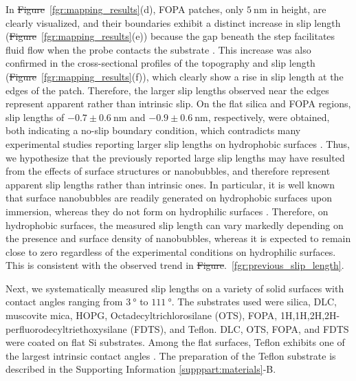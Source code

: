 \documentclass[journal=jacsat,manuscript=article]{achemso}
\providecommand{\DIFadd}[1]{{\protect\color{blue}\uwave{#1}}} %
\providecommand{\DIFdel}[1]{{\protect\color{red}\sout{#1}}} %
\providecommand{\DIFaddbegin}{} %
\providecommand{\DIFaddend}{} %
\providecommand{\DIFdelbegin}{} %
\providecommand{\DIFdelend}{} %
\newcommand{\DIFscaledelfig}{0.5}
\newlength{\DIFdelgraphicswidth} %
\newlength{\DIFdelgraphicsheight} %
\newcommand{\DIFaddincludegraphics}[2][]{{\color{blue}\fbox{\DIFOincludegraphics[#1]{#2}}}} %
\newcommand{\DIFdelincludegraphics}[2][]{%
\sbox{\DIFdelgraphicsbox}{\DIFOincludegraphics[#1]{#2}}%
\settoboxwidth{\DIFdelgraphicswidth}{\DIFdelgraphicsbox} %
\settoboxtotalheight{\DIFdelgraphicsheight}{\DIFdelgraphicsbox} %
\scalebox{\DIFscaledelfig}{%
\parbox[b]{\DIFdelgraphicswidth}{\usebox{\DIFdelgraphicsbox}\\[-\baselineskip] \rule{\DIFdelgraphicswidth}{0em}}\llap{\resizebox{\DIFdelgraphicswidth}{\DIFdelgraphicsheight}{%
\setlength{\unitlength}{\DIFdelgraphicswidth}%
\begin{picture}(1,1)%
\thicklines\linethickness{2pt} %
{\color[rgb]{1,0,0}\put(0,0){\framebox(1,1){}}}%
{\color[rgb]{1,0,0}\put(0,0){\line( 1,1){1}}}%
{\color[rgb]{1,0,0}\put(0,1){\line(1,-1){1}}}%
\end{picture}%
}\hspace*{3pt}}} %
} %
\DeclareRobustCommand{\DIFaddbegin}{\DIFOaddbegin \let\includegraphics\DIFaddincludegraphics} %
\DeclareRobustCommand{\DIFaddend}{\DIFOaddend \let\includegraphics\DIFOincludegraphics} %
\DeclareRobustCommand{\DIFdelbegin}{\DIFOdelbegin \let\includegraphics\DIFdelincludegraphics} %
\DeclareRobustCommand{\DIFdelend}{\DIFOaddend \let\includegraphics\DIFOincludegraphics} %
\begin{document}
In \DIFdelbegin \DIFdel{Figure}\DIFdelend \DIFaddbegin \DIFadd{Fig.}\DIFaddend ~\ref{fgr:mapping_results}(d), FOPA patches, only \(\SI{5}{\nano\metre}\) in height, are clearly visualized, and their boundaries exhibit a distinct increase in slip length (\DIFdelbegin \DIFdel{Figure}\DIFdelend \DIFaddbegin \DIFadd{Fig.}\DIFaddend ~\ref{fgr:mapping_results}(e)) because the gap beneath the step facilitates fluid flow when the probe contacts the substrate \cite{Ybert2007-jv}. This increase was also confirmed in the cross-sectional profiles of the topography and slip length (\DIFdelbegin \DIFdel{Figure}\DIFdelend \DIFaddbegin \DIFadd{Fig.}\DIFaddend ~\ref{fgr:mapping_results}(f)), which clearly show a rise in slip length at the edges of the patch. Therefore, the larger slip lengths observed near the edges represent apparent rather than intrinsic slip. On the flat silica and FOPA regions, slip lengths of \(-0.7 \pm \SI{0.6}{\nano\metre}\) and \(-0.9 \pm \SI{0.6}{\nano\metre}\), respectively, were obtained, both indicating a no-slip boundary condition, which contradicts many experimental studies reporting larger slip lengths on hydrophobic surfaces \cite{Tretheway2002-et, Cho2004-it, Bouzigues2008-xn, Cottin-Bizonne2008-nc, Lasne2008-qt, Bhushan2009-yz, Jing2013-kn, Zhang2021-tn, Li2022-qs, Han2025-qq}. Thus, we hypothesize that the previously reported large slip lengths may have resulted from the effects of surface structures or nanobubbles, and therefore represent apparent slip lengths rather than intrinsic ones. In particular, it is well known that surface nanobubbles are readily generated on hydrophobic surfaces upon immersion, whereas they do not form on hydrophilic surfaces \cite{Yang2003-mh, Agrawal2005-oo}. Therefore, on hydrophobic surfaces, the measured slip length can vary markedly depending on the presence and surface density of nanobubbles, whereas it is expected to remain close to zero regardless of the experimental conditions on hydrophilic surfaces. This is consistent with the observed trend in \DIFdelbegin \DIFdel{Figure}\DIFdelend \DIFaddbegin \DIFadd{Fig}\DIFaddend .~\ref{fgr:previous_slip_length}.

Next, we systematically measured slip lengths on a variety of solid surfaces with contact angles ranging from \(\SI{3}{\degree}\) to \(\SI{111}{\degree}\). The substrates used were silica, DLC, muscovite mica, HOPG, Octadecyltrichlorosilane (OTS), FOPA, 1H,1H,2H,2H-perfluorodecyltriethoxysilane (FDTS), and Teflon. DLC, OTS, FOPA, and FDTS were coated on flat Si substrates. Among the flat surfaces, Teflon exhibits one of the largest intrinsic contact angles \cite{Sas2012-bl, Crick2010-zw}. The preparation of the Teflon substrate is described in the Supporting Information \ref{supppart:materials}-B.
\end{document}
